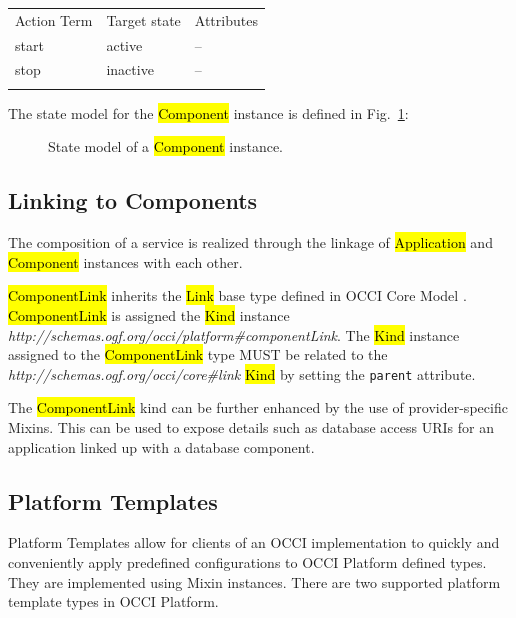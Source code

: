 \documentclass[10pt,a4paper]{article}
\begin{document}
{
	\begin{tabular}{lll}
	\toprule
	Action Term & Target state & Attributes \\
	\colrule
	start & active & -- \\
	stop & inactive & -- \\
	\botrule
	\end{tabular}
}

The state model for the \hl{Component} instance is defined in Fig.~\ref{fig:component_state}:

\begin{figure}[!h]
	{\centering {} \par}
	\caption{State model of a \hl{Component} instance.}
	\label{fig:component_state}
\end{figure}

\subsection{Linking to Components}

The composition of a service is realized through the linkage of \hl{Application} and \hl{Component} instances with each other.

\hl{ComponentLink} inherits the \hl{Link} base type defined in OCCI Core Model \cite{occi:core}. \hl{ComponentLink} is assigned the \hl{Kind} instance \textit{http://schemas.ogf.org/occi/platform\#componentLink}. The \hl{Kind} instance assigned to the \hl{ComponentLink} type MUST be related to the \textit{http://schemas.ogf.org/occi/core\#link} \hl{Kind} by setting the \texttt{parent} attribute.

The \hl{ComponentLink} kind can be further enhanced by the use of  provider-specific Mixins. This can be used to expose details such as database access URIs for an application linked up with a database component.

\subsection{Platform Templates}
Platform Templates allow for clients of an OCCI implementation to quickly and conveniently apply predefined configurations to OCCI Platform defined types. They are implemented using Mixin instances. There are two supported platform template types in OCCI Platform.
\end{document}
